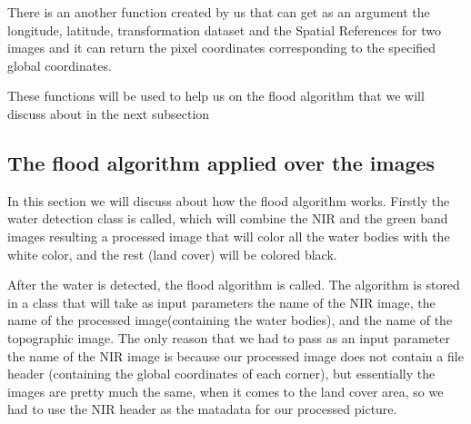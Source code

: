 \documentclass[12pt, a4paper]{report}
\begin{document}
\quad
There is an another function created by us that can get as an argument the longitude, latitude, transformation dataset and the Spatial References for two images and it can return the pixel coordinates corresponding to the specified global coordinates.
\par 
These functions will be used to help us on the flood algorithm that we will discuss about in the next subsection




\subsection{The flood algorithm applied over the images}

\quad
In this section we will discuss about how the flood algorithm works. Firstly the water detection class is called, which will combine the NIR and the green band images resulting a processed image that will color all the water bodies with the white color, and the rest (land cover) will be colored black.
\par 
 After the water is detected, the flood algorithm is called. The algorithm is stored in a class that will take as input parameters the name of the NIR image, the name of the processed image(containing the water bodies), and the name of the topographic image. The only reason that we had to pass as an input parameter the name of the NIR image is because our processed image does not contain a file header (containing the global coordinates of each corner), but essentially the images are pretty much the same, when it comes to the land cover area, so we had to use the NIR header as the matadata for our processed picture.
\par
\end{document}
